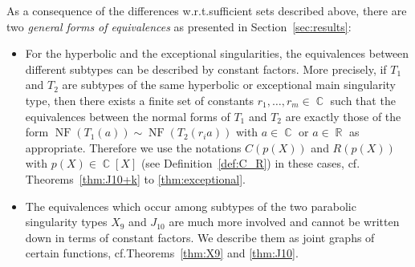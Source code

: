 \documentclass{amsproc}
\theoremstyle{definition}
\DeclareMathOperator{\R}{\mathbb{R}}
\DeclareMathOperator{\C}{\mathbb{C}}
\DeclareMathOperator{\NF}{NF}
\begin{document}
As a consequence of the differences w.r.t.\@ sufficient sets described above,
there are two \emph{general forms of equivalences} as presented in
Section~\ref{sec:results}:
\begin{itemize}
\item
For the hyperbolic and the exceptional singularities, the equivalences between
different subtypes can be described by constant factors. More precisely, if
$T_1$ and $T_2$ are subtypes of the same hyperbolic or exceptional main
singularity type, then there exists a finite set of constants
$r_1, \ldots, r_m \in \C$ such that the equivalences between the normal forms
of $T_1$ and $T_2$ are exactly those of the form
$\NF(T_1(a)) \sim \NF(T_2(r_i a))$ with $a \in \C$ or $a \in \R$ as
appropriate. Therefore we use the notations $C(p(X))$ and $R(p(X))$ with
$p(X) \in \C[X]$ (see Definition~\ref{def:C_R}) in these cases, cf.\@
Theorems~\ref{thm:J10+k} to \ref{thm:exceptional}.
\item
The equivalences which occur among subtypes of the two parabolic singularity
types $X_9$ and $J_{10}$ are much more involved and cannot be written down in
terms of constant factors. We describe them as joint graphs of certain
functions, cf.\@ Theorems~\ref{thm:X9} and \ref{thm:J10}.
\end{itemize}
\end{document}
